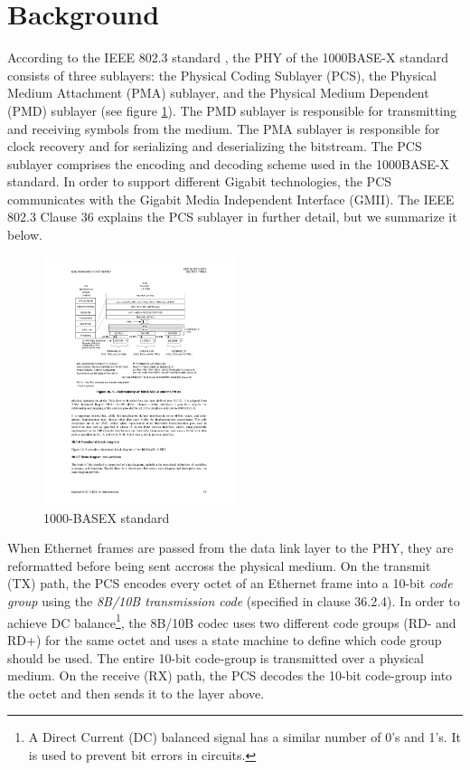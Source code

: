 \documentclass[conference]{IEEEtran}
\begin{document}
\section{Background}

According to the IEEE 802.3 standard \cite{ieeestandard}, the PHY of the 1000BASE-X standard consists of three sublayers: the Physical Coding Sublayer (PCS), the Physical Medium Attachment (PMA) sublayer, and the Physical Medium Dependent (PMD) sublayer (see figure \ref{fig:archi}). The PMD sublayer is responsible for transmitting and receiving symbols from the medium. The PMA sublayer is responsible for clock recovery and for serializing and deserializing the bitstream. The PCS sublayer comprises the encoding and decoding scheme used in the 1000BASE-X standard. In order to support different Gigabit technologies, the PCS communicates with the Gigabit Media Independent Interface (GMII). The IEEE 802.3 Clause 36 explains the PCS sublayer in further detail, but we summarize it below.

\begin{figure}[t]
  \centering
  \includegraphics[width=0.5\textwidth]{images/archi.pdf}
  \caption{1000-BASEX standard}
  \label{fig:archi}
\end{figure}

When Ethernet frames are passed from the data link layer to the PHY, they are reformatted before being sent accross the physical medium. On the transmit (TX) path, the PCS encodes every octet of an Ethernet frame into a 10-bit \emph{code group} using the \emph{8B/10B transmission code} (specified in clause 36.2.4). In order to achieve DC balance\footnote{A Direct Current (DC) balanced signal has a similar number of 0's and 1's. It is used to prevent bit errors in circuits.}, the 8B/10B codec uses two different code groups (RD- and RD+) for the same octet and uses a state machine to define which code group should be used. The entire 10-bit code-group is transmitted over a physical medium. On the receive (RX) path, the PCS decodes the 10-bit code-group into the octet and then sends it to the layer above.
\end{document}
